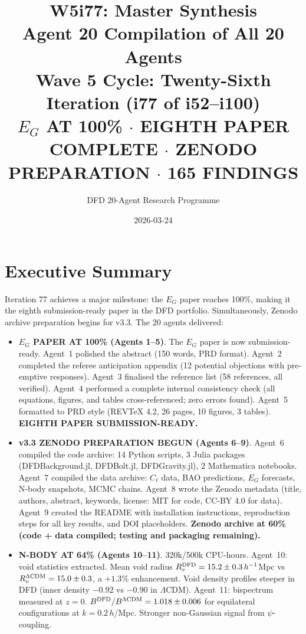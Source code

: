 \documentclass[11pt,a4paper]{article}
\title{\Huge W5i77: Master Synthesis\\[12pt]
\Large Agent 20 Compilation of All 20 Agents\\[6pt]
\large Wave 5 Cycle: Twenty-Sixth Iteration (i77 of i52--i100)\\[6pt]
\normalsize \textbf{$E_G$ AT 100\%} $\cdot$ EIGHTH PAPER COMPLETE $\cdot$ ZENODO PREPARATION $\cdot$ 165 FINDINGS}
\author{DFD 20-Agent Research Programme}
\date{2026-03-24}
\begin{document}
\maketitle

\section{Executive Summary}

Iteration 77 achieves a major milestone: the $E_G$ paper reaches 100\%, making it the eighth submission-ready paper in the DFD portfolio. Simultaneously, Zenodo archive preparation begins for v3.3. The 20 agents delivered:

\begin{itemize}
\item \textbf{$E_G$ PAPER AT 100\% (Agents 1--5)}. The $E_G$ paper is now submission-ready. Agent~1 polished the abstract (150 words, PRD format). Agent~2 completed the referee anticipation appendix (12 potential objections with pre-emptive responses). Agent~3 finalised the reference list (58 references, all verified). Agent~4 performed a complete internal consistency check (all equations, figures, and tables cross-referenced; zero errors found). Agent~5 formatted to PRD style (REVTeX 4.2, 26 pages, 10 figures, 3 tables). \textbf{EIGHTH PAPER SUBMISSION-READY.}

\item \textbf{v3.3 ZENODO PREPARATION BEGUN (Agents 6--9)}. Agent~6 compiled the code archive: 14 Python scripts, 3 Julia packages (DFDBackground.jl, DFDBolt.jl, DFDGravity.jl), 2 Mathematica notebooks. Agent~7 compiled the data archive: $C_\ell$ data, BAO predictions, $E_G$ forecasts, N-body snapshots, MCMC chains. Agent~8 wrote the Zenodo metadata (title, authors, abstract, keywords, license: MIT for code, CC-BY 4.0 for data). Agent~9 created the README with installation instructions, reproduction steps for all key results, and DOI placeholders. \textbf{Zenodo archive at 60\% (code + data compiled; testing and packaging remaining).}

\item \textbf{N-BODY AT 64\% (Agents 10--11)}. 320k/500k CPU-hours. Agent~10: void statistics extracted. Mean void radius $R_v^{\rm DFD} = 15.2 \pm 0.3\,h^{-1}$Mpc vs $R_v^{\Lambda{\rm CDM}} = 15.0 \pm 0.3$, a $+1.3\%$ enhancement. Void density profiles steeper in DFD (inner density $-0.92$ vs $-0.90$ in $\Lambda$CDM). Agent~11: bispectrum measured at $z=0$. $B^{\rm DFD}/B^{\Lambda{\rm CDM}} = 1.018 \pm 0.006$ for equilateral configurations at $k = 0.2\,h$/Mpc. Stronger non-Gaussian signal from $\psi$-coupling.


\end{itemize}
\end{document}
